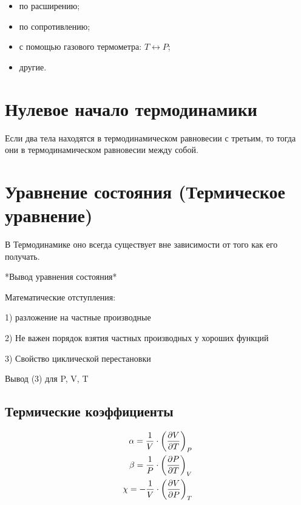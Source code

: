 \documentclass[../main.tex]{subfiles}
\begin{document}
    \begin{itemize}
        \item по расширению;
        \item по сопротивлению;
        \item с помощью газового термометра: $T \leftrightarrow P$;
        \item другие.
    \end{itemize}

    \section{Нулевое начало термодинамики}

    \begin{proposition}
        Если два тела находятся в термодинамическом равновесии с третьим, то тогда они в термодинамическом равновесии между собой.
    \end{proposition}
    
    \section{Уравнение состояния (Термическое уравнение)}

    \begin{note}
        В Термодинамике оно всегда существует вне зависимости от того как его получать.
    \end{note}
    *Вывод уравнения состояния*

    Математические отступления:

        1) разложение на частные производные

        2) Не важен порядок взятия частных производных у хороших функций

        3) Свойство циклической перестановки

    Вывод (3) для P, V, T

    \subsection{Термические коэффициенты}

    \begin{eqnarray}
        \alpha  =   \frac{1}{V} \cdot \left(\frac{\partial V}{\partial T}\right)_{P} \\
        \beta   =   \frac{1}{P} \cdot \left(\frac{\partial P}{\partial T}\right)_{V} \\
        \chi    = - \frac{1}{V} \cdot \left(\frac{\partial V}{\partial P}\right)_{T}
    \end{eqnarray}
\end{document}
